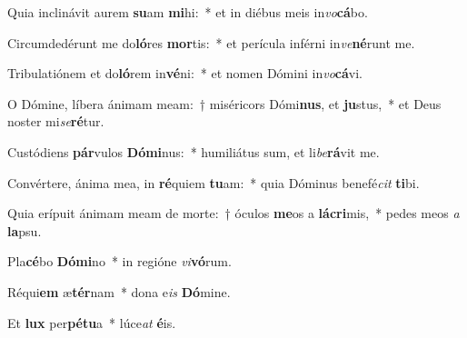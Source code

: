 ﻿\item Quia inclinávit aurem \textbf{su}am \textbf{mi}hi:~* et in diébus meis in\textit{vo}\textbf{cá}bo.
\item Circumdedérunt me do\textbf{ló}res \textbf{mor}tis:~* et perícula inférni in\textit{ve}\textbf{né}runt me.
\item Tribulatiónem et do\textbf{ló}rem in\textbf{vé}ni:~* et nomen Dómini in\textit{vo}\textbf{cá}vi.
\item O Dómine, líbera ánimam meam:~† miséricors Dómi\textbf{nus}, et \textbf{ju}stus,~* et Deus noster mi\textit{se}\textbf{ré}tur.
\item Custódiens \textbf{pár}vulos \textbf{Dó}\textbf{mi}nus:~* humiliátus sum, et li\textit{be}\textbf{rá}vit me.
\item Convértere, ánima mea, in \textbf{ré}quiem \textbf{tu}am:~* quia Dóminus benefé\textit{cit} \textbf{ti}bi.
\item Quia erípuit ánimam meam de morte:~† óculos \textbf{me}os a \textbf{lá}\textbf{cri}mis,~* pedes meos \textit{a} \textbf{la}psu.
\item Pla\textbf{cé}bo \textbf{Dó}\textbf{mi}no~* in regióne \textit{vi}\textbf{vó}rum.
\item Réqui\textbf{em} æ\textbf{tér}nam~* dona e\textit{is} \textbf{Dó}mine.
\item Et \textbf{lux} per\textbf{pé}\textbf{tu}a~* lúce\textit{at} \textbf{é}is.